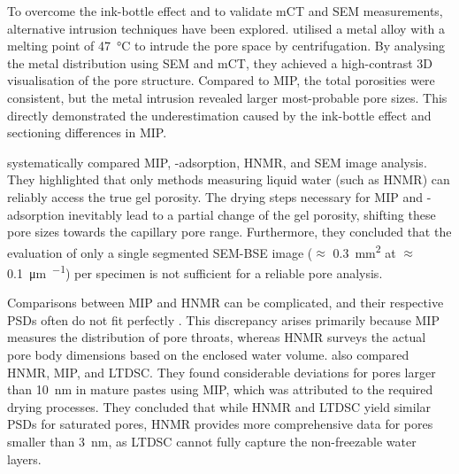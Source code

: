 To overcome the ink-bottle effect and to validate \ac{mCT} and \ac{SEM} measurements, alternative intrusion techniques have been explored.
\textcite{qian.2018} utilised a metal alloy with a melting point of \qty{47}{\celsius} to intrude the pore space by centrifugation.
By analysing the metal distribution using \ac{SEM} and \ac{mCT}, they achieved a high-contrast 3D visualisation of the pore structure.
Compared to \ac{MIP}, the total porosities were consistent, but the metal intrusion revealed larger most-probable pore sizes.
This directly demonstrated the underestimation caused by the ink-bottle effect and sectioning differences in \ac{MIP}.

\textcite{georget.2024} systematically compared \ac{MIP}, -adsorption, \ac{HNMR}, and \ac{SEM} image analysis.
They highlighted that only methods measuring liquid water (such as \ac{HNMR}) can reliably access the true gel porosity.
The drying steps necessary for \ac{MIP} and -adsorption inevitably lead to a partial change of the gel porosity, shifting these pore sizes towards the capillary pore range.
Furthermore, they concluded that the evaluation of only a single segmented \ac{SEM}-\ac{BSE} image ($\approx$ \qty{0.3}{\milli\meter\squared} at $\approx$ \qty{0.1}{\micro\meter\per\px}) per specimen is not sufficient for a reliable pore analysis.

Comparisons between \ac{MIP} and \ac{HNMR} can be complicated, and their respective \ac{PSD}s often do not fit perfectly \cite{tziotziou.2011}.
This discrepancy arises primarily because \ac{MIP} measures the distribution of pore throats, whereas \ac{HNMR} surveys the actual pore body dimensions based on the enclosed water volume.
\textcite{joseph.2024} also compared \ac{HNMR}, \ac{MIP}, and \ac{LTDSC}.
They found considerable deviations for pores larger than \qty{10}{\nano\meter} in mature pastes using \ac{MIP}, which was attributed to the required drying processes.
They concluded that while \ac{HNMR} and \ac{LTDSC} yield similar \ac{PSD}s for saturated pores, \ac{HNMR} provides more comprehensive data for pores smaller than \qty{3}{\nano\meter}, as \ac{LTDSC} cannot fully capture the non-freezable water layers.